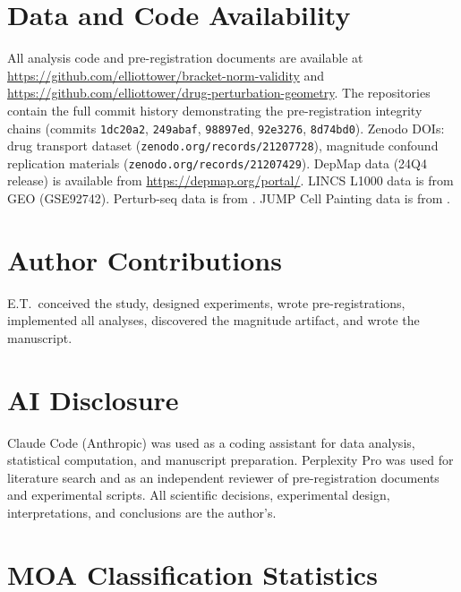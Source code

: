 \documentclass[11pt]{article}
\begin{document}
\section*{Data and Code Availability}

All analysis code and pre-registration documents are available at
\url{https://github.com/elliottower/bracket-norm-validity} and
\url{https://github.com/elliottower/drug-perturbation-geometry}.
The repositories contain the full commit history demonstrating the
pre-registration integrity chains (commits \texttt{1dc20a2},
\texttt{249abaf}, \texttt{98897ed}, \texttt{92e3276}, \texttt{8d74bd0}).
Zenodo DOIs: drug transport dataset
(\texttt{zenodo.org/records/21207728}), magnitude confound replication
materials (\texttt{zenodo.org/records/21207429}).
DepMap data (24Q4 release) is available from
\url{https://depmap.org/portal/}. LINCS L1000 data is from GEO
(GSE92742). Perturb-seq data is from \citet{replogle2022mapping}. JUMP
Cell Painting data is from \citet{chandrasekaran2023jump}.

\section*{Author Contributions}

E.T.\ conceived the study, designed experiments, wrote
pre-registrations, implemented all analyses, discovered the magnitude
artifact, and wrote the manuscript.

\section*{AI Disclosure}

Claude Code (Anthropic) was used as a coding assistant for data
analysis, statistical computation, and manuscript preparation.
Perplexity Pro was used for literature search and as an independent
reviewer of pre-registration documents and experimental scripts.
All scientific decisions, experimental design, interpretations, and
conclusions are the author's.




\appendix

\section{MOA Classification Statistics}
\label{app:moa}
\end{document}
